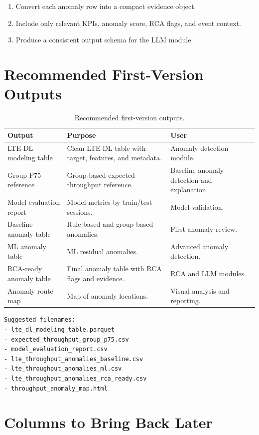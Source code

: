 \documentclass[12pt,a4paper]{article}
\begin{document}
\begin{enumerate}
    \item Convert each anomaly row into a compact evidence object.
    \item Include only relevant KPIs, anomaly score, RCA flags, and event context.
    \item Produce a consistent output schema for the LLM module.
\end{enumerate}

\section{Recommended First-Version Outputs}

\begin{table}[H]
\centering
\begin{tabularx}{\textwidth}{@{}L{0.28\textwidth}YY@{}}
\toprule
\textbf{Output} & \textbf{Purpose} & \textbf{User} \\
\midrule
LTE-DL modeling table & Clean LTE-DL table with target, features, and metadata. & Anomaly detection module. \\
Group P75 reference & Group-based expected throughput reference. & Baseline anomaly detection and explanation. \\
Model evaluation report & Model metrics by train/test sessions. & Model validation. \\
Baseline anomaly table & Rule-based and group-based anomalies. & First anomaly review. \\
ML anomaly table & ML residual anomalies. & Advanced anomaly detection. \\
RCA-ready anomaly table & Final anomaly table with RCA flags and evidence. & RCA and LLM modules. \\
Anomaly route map & Map of anomaly locations. & Visual analysis and reporting. \\
\bottomrule
\end{tabularx}
\caption{Recommended first-version outputs.}
\end{table}

\begin{lstlisting}
Suggested filenames:
- lte_dl_modeling_table.parquet
- expected_throughput_group_p75.csv
- model_evaluation_report.csv
- lte_throughput_anomalies_baseline.csv
- lte_throughput_anomalies_ml.csv
- lte_throughput_anomalies_rca_ready.csv
- throughput_anomaly_map.html
\end{lstlisting}

\section{Columns to Bring Back Later}
\end{document}
